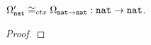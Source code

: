 \begin{framed}
\begin{proposition}\label{pr:context:op-right-left}
  $\Omega'_{\texttt{nat}} \cong_{ctx} \Omega_{\texttt{nat}\to\texttt{nat}} : \texttt{nat}\to\texttt{nat}$.
\end{proposition}  
\end{framed}
\begin{proof}


\end{proof}
